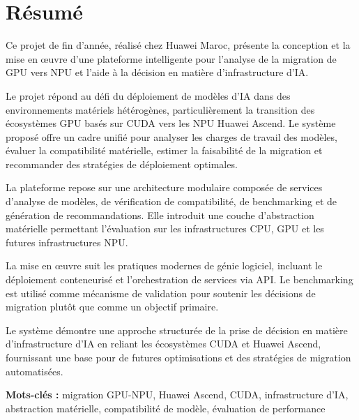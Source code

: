 \chapter*{Résumé}
\label{chap:abstract-fr}

Ce projet de fin d'année, réalisé chez Huawei Maroc, présente la conception et la mise en œuvre d'une plateforme intelligente pour l'analyse de la migration de GPU vers NPU et l'aide à la décision en matière d'infrastructure d'IA.

Le projet répond au défi du déploiement de modèles d'IA dans des environnements matériels hétérogènes, particulièrement la transition des écosystèmes GPU basés sur CUDA vers les NPU Huawei Ascend. Le système proposé offre un cadre unifié pour analyser les charges de travail des modèles, évaluer la compatibilité matérielle, estimer la faisabilité de la migration et recommander des stratégies de déploiement optimales.

La plateforme repose sur une architecture modulaire composée de services d'analyse de modèles, de vérification de compatibilité, de benchmarking et de génération de recommandations. Elle introduit une couche d'abstraction matérielle permettant l'évaluation sur les infrastructures CPU, GPU et les futures infrastructures NPU.

La mise en œuvre suit les pratiques modernes de génie logiciel, incluant le déploiement conteneurisé et l'orchestration de services via API. Le benchmarking est utilisé comme mécanisme de validation pour soutenir les décisions de migration plutôt que comme un objectif primaire.

Le système démontre une approche structurée de la prise de décision en matière d'infrastructure d'IA en reliant les écosystèmes CUDA et Huawei Ascend, fournissant une base pour de futures optimisations et des stratégies de migration automatisées.

\vspace{0.5cm}
\noindent\textbf{Mots-clés :} migration GPU-NPU, Huawei Ascend, CUDA, infrastructure d'IA, abstraction matérielle, compatibilité de modèle, évaluation de performance
